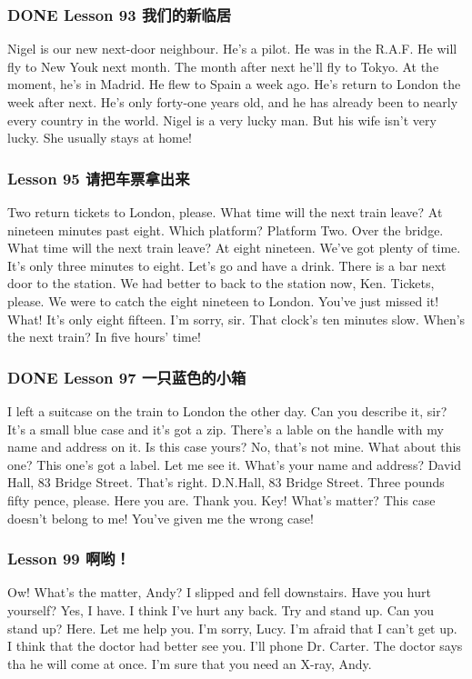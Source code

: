 \documentclass[11pt]{ctexart}
\begin{document}
\subsubsection{{\bfseries\sffamily DONE} Lesson 93 我们的新临居}
\label{sec:orgf8db048}
Nigel is our new next-door neighbour.
He's a pilot.
He was in the R.A.F.
He will fly to New Youk next month.
The month after next he'll fly to Tokyo.
At the moment, he's in Madrid.
He flew to Spain a week ago.
He's return to London the week after next.
He's only forty-one years old,
and he has already been to nearly every country in the world.
Nigel is a very lucky man.
But his wife isn't very lucky. She usually stays at home!
\subsubsection{Lesson 95 请把车票拿出来}
\label{sec:org0f4b4ab}
Two return tickets to London, please.
What time will the next train leave?
At nineteen minutes past eight.
Which platform?
Platform Two. Over the bridge.
What time will the next train leave?
At eight nineteen.
We've got plenty of time.
It's only three minutes to eight.
Let's go and have a drink.
There is a bar next door to the station.
We had better to back to the station now, Ken.
Tickets, please.
We were to catch the eight nineteen to London.
You've just missed it!
What! It's only eight fifteen.
I'm sorry, sir.
That clock's ten minutes slow.
When's the next train?
In five hours' time!
\subsubsection{{\bfseries\sffamily DONE} Lesson 97 一只蓝色的小箱}
\label{sec:org5c5bd69}
I left a suitcase on the train to London the other day.
Can you describe it, sir?
It's a small blue case and it's got a zip.
There's a lable on the handle with my name and address on it.
Is this case yours?
No, that's not mine.
What about this one?
This one's got a label.
Let me see it.
What's your name and address?
David Hall, 83 Bridge Street.
That's right. D.N.Hall, 83 Bridge Street.
Three pounds fifty pence, please.
Here you are. Thank you.
Key!
What's matter?
This case doesn't belong to me!
You've given me the wrong case!
\subsubsection{Lesson 99 啊哟！}
\label{sec:org3473609}
Ow!
What's the matter, Andy?
I slipped and fell downstairs.
Have you hurt yourself?
Yes, I have. I think I've hurt any back.
Try and stand up.
Can you stand up?
Here. Let me help you.
I'm sorry, Lucy.
I'm afraid that I can't get up.
I think that the doctor had better see you.
I'll phone Dr. Carter.
The doctor says tha he will come at once.
I'm sure that you need an X-ray, Andy.
\end{document}
